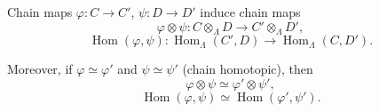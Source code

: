 Chain maps $\varphi : C \rightarrow C'$, $\psi : D \rightarrow D'$ induce chain maps
$$\varphi \otimes \psi : C \otimes_{\Lambda} D \rightarrow C' \otimes_{\Lambda} D',$$
$$\operatorname{Hom}(\varphi, \psi) : \operatorname{Hom}_{\Lambda}(C', D) \rightarrow \operatorname{Hom}_{\Lambda}(C, D').$$

Moreover, if $\varphi \simeq \varphi'$ and $\psi \simeq \psi'$ (chain homotopic), then
$$\varphi \otimes \psi \simeq \varphi' \otimes \psi',$$
$$\operatorname{Hom}(\varphi, \psi) \simeq \operatorname{Hom}(\varphi', \psi').$$
